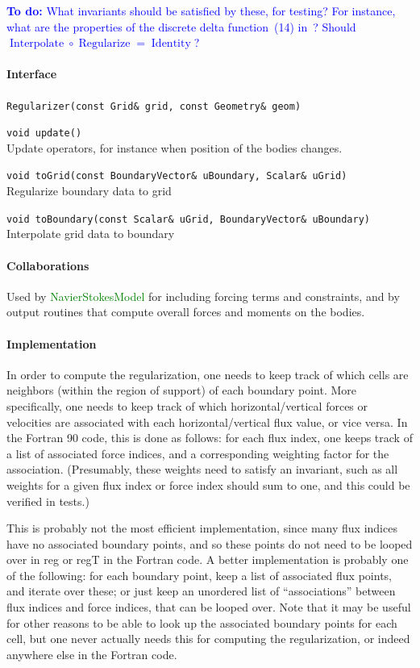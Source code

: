 \documentclass[11pt]{article}
\def\todo#1{\textcolor{blue}{{\bf To do:} #1}}
\def\class#1{\textcolor{green}{\ttfamily\small #1}} %
\def\fn#1{{\ttfamily\small #1}} %
\let\code\lstinline
\begin{document}
\todo{What invariants should be satisfied by these, for testing?  For instance, what are the properties of the discrete delta function~(14) in~\cite{TaiCol-06}?  Should $\operatorname{Interpolate}\circ\operatorname{Regularize} = \operatorname{Identity}$?}

\paragraph{Interface}
\begin{description}
	\item \code|Regularizer(const Grid& grid, const Geometry& geom)|
	\item \code|void update()|\\
	Update operators, for instance when position of the bodies changes.
	\item \code|void toGrid(const BoundaryVector& uBoundary, Scalar& uGrid)|\\
	Regularize boundary data to grid
	\item \code|void toBoundary(const Scalar& uGrid, BoundaryVector& uBoundary)|\\
	Interpolate grid data to boundary
\end{description}

\paragraph{Collaborations}
Used by \class{NavierStokesModel} for including forcing terms and constraints, and by output routines that compute overall forces and moments on the bodies.

\paragraph{Implementation}
In order to compute the regularization, one needs to keep track of which cells are neighbors (within the region of support) of each boundary point.  More specifically, one needs to keep track of which horizontal/vertical forces or velocities are associated with each horizontal/vertical flux value, or vice versa.  In the Fortran 90 code, this is done as follows: for each flux index, one keeps track of a list of associated force indices, and a corresponding weighting factor for the association.  (Presumably, these weights need to satisfy an invariant, such as all weights for a given flux index or force index should sum to one, and this could be verified in tests.)

This is probably not the most efficient implementation, since many flux indices have no associated boundary points, and so these points do not need to be looped over in \fn{reg} or \fn{regT} in the Fortran code.  A better implementation is probably one of the following: for each boundary point, keep a list of associated flux points, and iterate over these; or just keep an unordered list of ``associations'' between flux indices and force indices, that can be looped over.  Note that it may be useful for other reasons to be able to look up the associated boundary points for each cell, but one never actually needs this for computing the regularization, or indeed anywhere else in the Fortran code.
\end{document}

